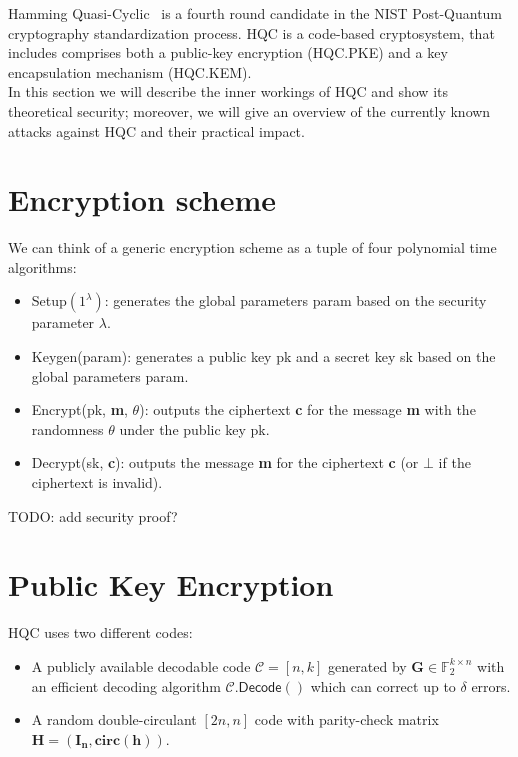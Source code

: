 Hamming Quasi-Cyclic~\cite{melchor2018hamming} is a fourth round candidate in the NIST Post-Quantum cryptography standardization process.
HQC is a code-based cryptosystem, that includes comprises both a public-key encryption (\textsf{HQC.PKE}) and a
key encapsulation mechanism (\textsf{HQC.KEM}).\\
In this section we will describe the inner workings of HQC and show its theoretical security; moreover,
we will give an overview of the currently known attacks against HQC and their practical impact.

\section{Encryption scheme}\label{sec:encryption}
We can think of a generic encryption scheme as a tuple of four polynomial time algorithms:
\begin{itemize}
    \item \textsf{Setup}$(1^\lambda)$: generates the global parameters \textsf{param} based on the security parameter $\lambda$.
    \item \textsf{Keygen(param)}: generates a public key \textsf{pk} and a secret key \textsf{sk} based on the global parameters \textsf{param}.
    \item \textsf{Encrypt(pk, \textbf{m}, $\theta$)}: outputs the ciphertext \textbf{c} for the message \textbf{m} with the randomness $\theta$ under the public key \textsf{pk}.
    \item \textsf{Decrypt(sk, \textbf{c})}: outputs the message \textbf{m} for the ciphertext \textbf{c} (or $\bot$ if the ciphertext is invalid).
\end{itemize}

TODO: add security proof?

\section{Public Key Encryption}\label{sec:pke}
HQC uses two different codes:
\begin{itemize}
    \item A publicly available decodable code $\mathcal{C} = [n, k]$ generated by $\mathbf{G} \in \mathds{F}_2^{k \times n}$  with an efficient decoding algorithm 
    $\mathcal{C}.\textsf{Decode}()$ which can correct up to $\delta$ errors.
    \item A random double-circulant $[2n,n]$ code with parity-check matrix $\mathbf{H} = (\mathbf{I_n, circ(h)})$. 
\end{itemize}

